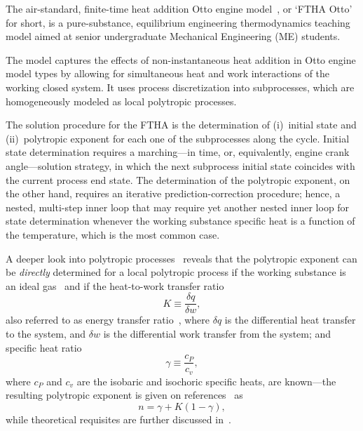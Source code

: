     The air-standard, finite-time heat addition Otto engine model~\cite{2017-NaaktgeborenC-IntJMechEngEduc}, or `FTHA Otto'  for
    short, is a pure-substance, equilibrium engineering thermodynamics teaching model aimed at senior  undergraduate  Mechanical
    Engineering (ME) students.

    The model captures the effects of non-in\-stan\-ta\-neous  heat  addition  in  Otto  engine  model  types  by  allowing  for
    simultaneous heat and work interactions of the working closed system. It  uses  process  discretization  into  subprocesses,
    which are homogeneously modeled as local polytropic processes.

    The solution procedure for the FTHA is the determination of (i)~initial state and (ii)~polytropic exponent for each  one  of
    the subprocesses along the cycle. Initial state determination requires a marching---in time, or, equivalently, engine  crank
    angle---solution strategy, in which the next subprocess initial state coincides with the  current  process  end  state.  The
    determination of the polytropic exponent, on the other hand, requires an iterative prediction-correction procedure; hence, a
    nested, multi-step inner loop that may require yet another nested inner loop for state determination  whenever  the  working
    substance specific heat is a function of the temperature, which is the most common case.

    A deeper look into polytropic processes~\cite{2012-ChristiansJ-IntJMechEngEduc, 2020-NaaktgeborenC-Polytropic-engrXiv-rev02}
    reveals that the polytropic exponent can be \emph{directly} determined  for  a  local  polytropic  process  if  the  working
    substance is an ideal gas~\cite{2020-NaaktgeborenC-Polytropic-engrXiv-rev02} and if the heat-to-work transfer ratio%
    \begin{equation}
        K \equiv \frac{\delta q}{\delta w},
        \label{eq:def.K}
    \end{equation}
    \noindent also referred to as  energy  transfer  ratio~\cite{2012-ChristiansJ-IntJMechEngEduc},  where  $\delta  q$  is  the
    differential heat transfer to the system, and $\delta w$ is the differential work transfer from  the  system;  and  specific
    heat ratio%
    \begin{equation}
        \gamma \equiv \frac{c_P}{c_v},
        \label{eq:def.gamma}
    \end{equation}
    \noindent where $c_P$ and $c_v$ are the isobaric and isochoric specific heats, are known---the resulting polytropic exponent
    is   given   on   references~\cite{2012-ChristiansJ-IntJMechEngEduc,   2020-NaaktgeborenC-Polytropic-engrXiv-rev02} as%
    \begin{equation}
        n = \gamma + K(1 - \gamma),
        \label{eq:n}
    \end{equation}
    \noindent while theoretical requisites are further discussed in~\cite{2020-NaaktgeborenC-Polytropic-engrXiv-rev02}.

